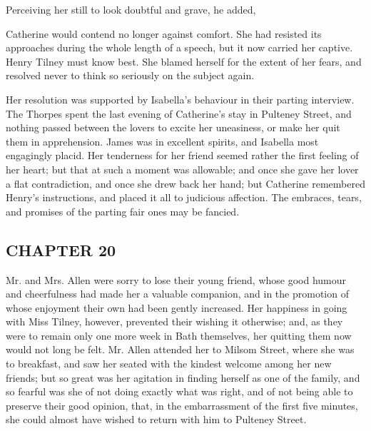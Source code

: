 Perceiving her still to look doubtful and grave, he added, 

Catherine would contend no longer against comfort. She had resisted its approaches during the whole length of a speech, but it now carried her captive. Henry Tilney must know best. She blamed herself for the extent of her fears, and resolved never to think so seriously on the subject again.

Her resolution was supported by Isabella's behaviour in their parting interview. The Thorpes spent the last evening of Catherine's stay in Pulteney Street, and nothing passed between the lovers to excite her uneasiness, or make her quit them in apprehension. James was in excellent spirits, and Isabella most engagingly placid. Her tenderness for her friend seemed rather the first feeling of her heart; but that at such a moment was allowable; and once she gave her lover a flat contradiction, and once she drew back her hand; but Catherine remembered Henry's instructions, and placed it all to judicious affection. The embraces, tears, and promises of the parting fair ones may be fancied.

\subsection[chapter-20]{\useURL[url22][][][]\from[url22]CHAPTER 20}

Mr. and Mrs. Allen were sorry to lose their young friend, whose good humour and cheerfulness had made her a valuable companion, and in the promotion of whose enjoyment their own had been gently increased. Her happiness in going with Miss Tilney, however, prevented their wishing it otherwise; and, as they were to remain only one more week in Bath themselves, her quitting them now would not long be felt. Mr. Allen attended her to Milsom Street, where she was to breakfast, and saw her seated with the kindest welcome among her new friends; but so great was her agitation in finding herself as one of the family, and so fearful was she of not doing exactly what was right, and of not being able to preserve their good opinion, that, in the embarrassment of the first five minutes, she could almost have wished to return with him to Pulteney Street.

